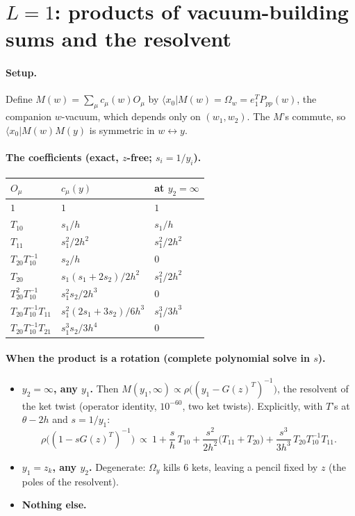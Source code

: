 \documentclass[11pt]{article}
\newcommand{\bra}[1]{\langle #1|}
\newcommand{\Om}{\Omega}
\begin{document}
\section{$L=1$: products of vacuum-building sums and the resolvent}

\paragraph{Setup.} Define $M(w)=\sum_\mu c_\mu(w)O_\mu$ by $\bra{x_0}M(w)=\Om_w=e_1^TP_{pp}(w)$, the companion $w$-vacuum, which depends only on $(w_1,w_2)$. The $M$'s commute, so $\bra{x_0}M(w)M(y)$ is symmetric in $w\leftrightarrow y$.

\paragraph{The coefficients (exact, $z$-free; $s_i=1/y_i$).}

\begin{center}
\begin{tabular}{lll}
\toprule
$O_\mu$ & $c_\mu(y)$ & at $y_2=\infty$\\
\midrule
$1$ & $1$ & $1$\\
$T_{10}$ & $s_1/h$ & $s_1/h$\\
$T_{11}$ & $s_1^2/2h^2$ & $s_1^2/2h^2$\\
$T_{20}T_{10}^{-1}$ & $s_2/h$ & 0\\
$T_{20}$ & $s_1(s_1+2s_2)/2h^2$ & $s_1^2/2h^2$\\
$T_{20}^2T_{10}^{-1}$ & $s_1^2s_2/2h^3$ & 0\\
$T_{20}T_{10}^{-1}T_{11}$ & $s_1^2(2s_1+3s_2)/6h^3$ & $s_1^3/3h^3$\\
$T_{20}T_{10}^{-1}T_{21}$ & $s_1^3s_2/3h^4$ & 0\\
\bottomrule
\end{tabular}
\end{center}

\paragraph{When the product is a rotation (complete polynomial solve in $s$).}
\begin{itemize}
\item \textbf{$y_2=\infty$, any $y_1$.} Then $M(y_1,\infty)\propto\rho\big((y_1-G(z)^T)^{-1}\big)$, the resolvent of the ket twist (operator identity, $10^{-60}$, two ket twists). Explicitly, with $T$'s at $\theta-2h$ and $s=1/y_1$:
\[
\rho\big((1-sG(z)^T)^{-1}\big)\ \propto\ 1+\frac sh\,T_{10}+\frac{s^2}{2h^2}\big(T_{11}+T_{20}\big)+\frac{s^3}{3h^3}\,T_{20}T_{10}^{-1}T_{11}.
\]
\item \textbf{$y_1=z_k$, any $y_2$.} Degenerate: $\Om_y$ kills 6 kets, leaving a pencil fixed by $z$ (the poles of the resolvent).
\item \textbf{Nothing else.}
\end{itemize}
\end{document}
